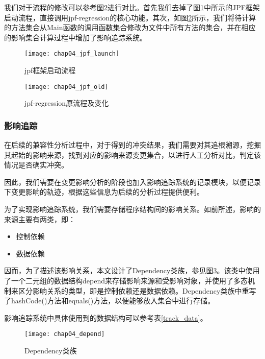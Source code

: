 我们对于流程的修改可以参考图\ref {impact_process_old}进行对比。首先我们去掉了图\ref {impact_process}中所示的JPF框架启动流程，直接调用jpf-regression的核心功能。其次，如图\ref {impact_process_old}所示，我们将待计算的方法集合从Main函数的调用函数集合修改为文件中所有方法的集合，并在相应的影响集合计算过程中增加了影响追踪系统。

\begin{figure}[H]
	\centering
	\texttt{[image: chap04\_jpf\_launch]}
	\caption {jpf框架启动流程}
	\label {impact_process}	
\end{figure}


\begin{figure}[H]
	\centering
	\texttt{[image: chap04\_jpf\_old]}
	\caption {jpf-regression原流程及变化}
	\label {impact_process_old}	
\end{figure}

\subsubsection{影响追踪}

在后续的兼容性分析过程中，对于得到的冲突结果，我们需要对其追根溯源，挖掘其起始的影响来源，找到对应的影响来源变更集合，以进行人工分析对比，判定该情况是否确实冲突。

因此，我们需要在变更影响分析的阶段也加入影响追踪系统的记录模块，以便记录下变更影响的轨迹，根据这些信息为后续的分析过程提供便利。

为了实现影响追踪系统，我们需要存储程序结构间的影响关系。如前所述，影响的来源主要有两类，即：
\begin{itemize}
	\item 控制依赖
	\item 数据依赖
\end{itemize}

因而，为了描述该影响关系，本文设计了Dependency类族，参见图\ref {class_depend}。该类中使用了一个二元组的数据结构depend来存储影响来源和受影响对象，并使用了多态机制来区分影响关系的类型，即是控制依赖还是数据依赖。Dependency类族中重写了hashCode()方法和equals()方法，以便能够放入集合中进行存储。

影响追踪系统中具体使用到的数据结构可以参考表\ref {track_data}。

\begin{figure}[H]
	\centering
	\texttt{[image: chap04\_depend]}
	\caption {Dependency类族}
	\label {class_depend}	
\end{figure}

